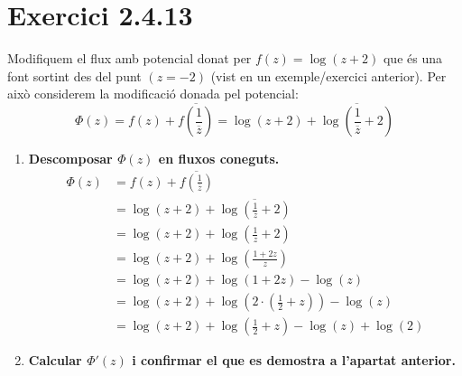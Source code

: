 \documentclass[a4paper, 11pt]{article}
\begin{document}
\section{Exercici 2.4.13}
Modifiquem el flux amb potencial donat per $f(z) = \log(z+2)$ que és una font sortint des del punt $(z = -2)$ (vist en un exemple/exercici anterior). Per això considerem la modificació donada pel potencial:
    \begin{equation*}
    \Phi(z) = f(z) + \overline{f\left(\frac{1}{\overline{z}}\right)} = \log(z+2) + \overline{\log\left(\frac{1}{\overline{z}}+2\right)}
\end{equation*}
     \begin{enumerate}[label=(\alph*)]
         \item \textbf{Descomposar $\Phi(z)$ en fluxos coneguts.}
         \begin{equation*}
            \begin{split}
                 \Phi(z) & = f(z) + \overline{f\left(\frac{1}{\overline{z}}\right)}\\
                        & = \log(z+2) + \overline{\log\left(\frac{1}{\overline{z}}+2\right)}\\
                        & = \log(z+2) + \log\left(\frac{1}{z}+2\right)\\
                        & = \log(z+2) + \log\left(\frac{1+2z}{z}\right)\\
                        & = \log(z+2) + \log(1+2z) - \log(z)\\
                        & = \log(z+2) + \log\left( 2\cdot \left(\frac{1}{2}+z\right)\right) - \log(z)\\
                        & = \log(z+2) + \log\left(\frac{1}{2}+z\right) - \log(z) + \log(2)
            \end{split}
        \end{equation*}
         \item \textbf{Calcular $\Phi '(z)$ i confirmar el que es demostra a l'apartat anterior.}
     

\end{enumerate}
\end{document}
